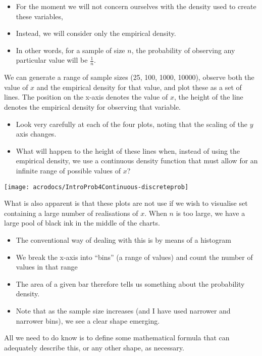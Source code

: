 \documentclass[12pt]{extbook}
\begin{document}
\begin{itemize}
\item  For the moment we will not concern ourselves with the density used to create these variables, 
\item Instead, we will consider only the empirical density.   
\item In other words, for a sample of size $n$, the probability of observing any particular value will be $\frac{1}{n}$.   
\end{itemize}

We can generate a range of sample sizes (25, 100, 1000, 10000), observe both the value of $x$ and the empirical density for that value, and plot these as a set of lines.   The position on the x-axis denotes the value of $x$, the height of the line denotes the empirical density for observing that variable.

\begin{itemize}
\item Look very carefully at each of the four plots, noting that the scaling of the $y$ axis changes.
\item What will happen to the height of these lines when, instead of using the empirical density, we use a continuous density function that must allow for an infinite range of possible values of $x$?
\end{itemize}


\texttt{[image: acrodocs/IntroProb4Continuous-discreteprob]}





What is also apparent is that these plots are not use if we wish to visualise set containing a large number of realisations of $x$.   When $n$ is too large, we have a large pool of black ink in the middle of the charts.  

\begin{itemize}
\item The conventional way of dealing with this is by means of a histogram
\item We break the x-axis into ``bins'' (a range of values) and count the number of values in that range
\item The area of a given bar therefore tells us something about the probability density.   
\item Note that as the sample size increases (and I have used narrower and narrower bins), we see a clear shape emerging.
\end{itemize}
All we need to do know is to define some mathematical formula that can adequately describe this, or any other shape, as necessary.
\end{document}
